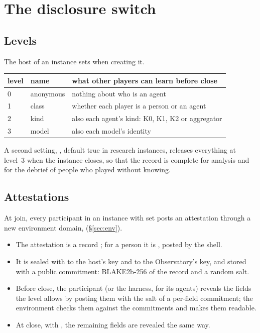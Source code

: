 \documentclass[11pt,a4paper]{article}
\begin{document}
\section{The disclosure switch}\label{sec:disclosure}

\subsection{Levels}

The host of an instance sets  when creating it.

\begin{center}\small
\begin{tabularx}{\linewidth}{@{}l>{\raggedright\arraybackslash}p{38mm}X@{}}
\toprule
level & name & what other players can learn before close \\
\midrule
0 & anonymous & nothing about who is an agent \\
1 & class & whether each player is a person or an agent \\
2 & kind & also each agent's kind: K0, K1, K2 or aggregator \\
3 & model & also each model's identity \\
\bottomrule
\end{tabularx}
\end{center}

A second setting, , default true in research instances, releases everything at
level~3 when the instance closes, so that the record is complete for analysis and for the debrief
of people who played without knowing.

\subsection{Attestations}

At join, every participant in an instance with  set posts an attestation through a
new environment domain,  (\S\ref{sec:env}).

\begin{itemize}[itemsep=2pt]
\item The attestation is a record ; for a person it is
  , posted by the shell.
\item It is sealed with  to the host's key and to the Observatory's key, and
  stored with a public commitment: BLAKE2b-256 of the record and a random salt.
\item Before close, the participant (or the harness, for its agents) reveals the fields the level
  allows by posting them with the salt of a per-field commitment; the environment checks them
  against the commitments and makes them readable.
\item At close, with , the remaining fields are revealed the same way.
\end{itemize}
\end{document}
